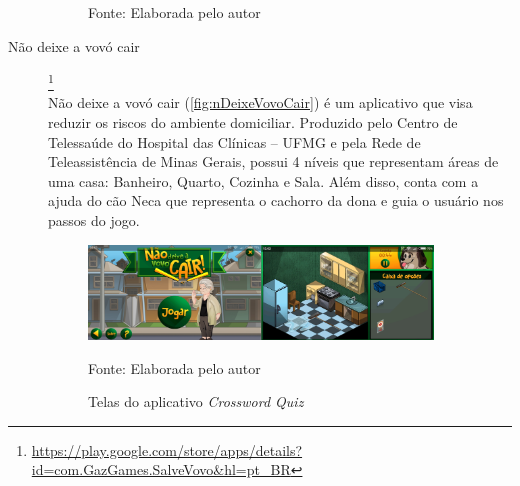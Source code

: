 \begin{description}
\begin{figure}[H]
    Fonte: Elaborada pelo autor
\end{figure}


\item[Não deixe a vovó cair]\footnote{\url{https://play.google.com/store/apps/details?id=com.GazGames.SalveVovo&hl=pt_BR}} \hfill \\
Não deixe a vovó cair (\autoref{fig:nDeixeVovoCair}) é um aplicativo que visa reduzir os riscos do ambiente domiciliar. Produzido pelo Centro de Telessaúde do Hospital das Clínicas – UFMG e pela Rede de Teleassistência de Minas Gerais, possui 4 níveis que representam áreas de uma casa: Banheiro, Quarto, Cozinha e Sala. Além disso, conta com a ajuda do cão Neca que representa o cachorro da dona e guia o usuário nos passos do jogo.
\begin{figure}[H]
\centering
    \caption{Telas do aplicativo \textit{Crossword Quiz}}
    \label{fig:nDeixeVovoCair}
    \includegraphics[width=0.9\textwidth]{Figuras/nDeixeVovoCair.jpg}
    
    Fonte: Elaborada pelo autor
\end{figure}


\end{description}


